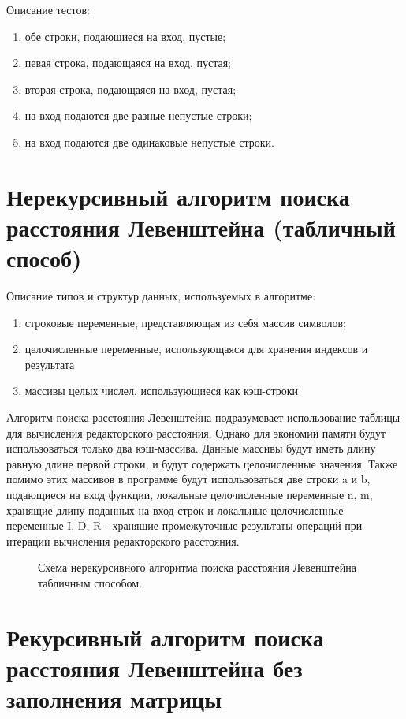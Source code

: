 Описание тестов:
\begin{enumerate}
	\item обе строки, подающиеся на вход, пустые;
	\item певая строка, подающаяся на вход, пустая;
	\item вторая строка, подающаяся на вход, пустая;
	\item на вход подаются две разные непустые строки;
	\item на вход подаются две одинаковые непустые строки.
\end{enumerate}

\section{Нерекурсивный алгоритм поиска расстояния Левенштейна (табличный
способ)}

Описание типов и структур данных, используемых в алгоритме:
\begin{enumerate}
	\item строковые переменные, представляющая из себя массив символов;
	\item целочисленные переменные, использующаяся для хранения индексов и результата
	\item массивы целых числел, использующиеся как кэш-строки
\end{enumerate}

Алгоритм поиска расстояния Левенштейна подразумевает использование таблицы для вычисления редакторского расстояния. Однако для экономии памяти будут использоваться только два кэш-массива. Данные массивы будут иметь длину равную длине первой строки, и будут содержать целочисленные значения. Также помимо этих массивов в программе будут использоваться две строки a и b, подающиеся на вход функции, локальные целочисленные переменные n, m, хранящие длину поданных на вход строк и локальные целочисленные переменные I, D, R - хранящие промежуточные результаты операций при итерации вычисления редакторского расстояния.

\begin{figure}[ph!]
	\caption{Схема нерекурсивного алгоритма поиска расстояния Левенштейна табличным способом.}
\end{figure}

\newpage

\section{Рекурсивный алгоритм поиска расстояния Левенштейна без заполнения
матрицы}

